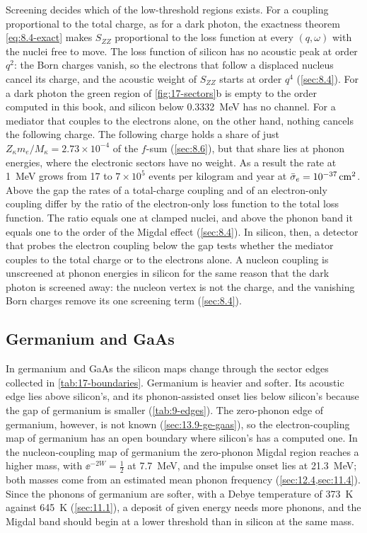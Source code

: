 Screening decides which of the low-threshold regions exists. For a coupling proportional to the total charge, as for a dark photon, the exactness theorem \cref{eq:8.4-exact} makes $S_{ZZ}$ proportional to the loss function at every $(q,\omega)$ with the nuclei free to move. The loss function of silicon has no acoustic peak at order $q^2$: the Born charges vanish, so the electrons that follow a displaced nucleus cancel its charge, and the acoustic weight of $S_{ZZ}$ starts at order $q^4$ (\cref{sec:8.4}). For a dark photon the green region of \cref{fig:17-sectors}b is empty to the order computed in this book, and silicon below \SI{0.3332}{MeV} has no channel. For a mediator that couples to the electrons alone, on the other hand, nothing cancels the following charge. The following charge holds a share of just $Z_\kappa m_e/M_\kappa = 2.73\times10^{-4}$ of the $f$-sum (\cref{sec:8.6}), but that share lies at phonon energies, where the electronic sectors have no weight. As a result the rate at \SI{1}{MeV} grows from 17 to $7\times10^5$ events per kilogram and year at $\bar{\sigma}_{e} = \SI{e-37}{cm^2}$. Above the gap the rates of a total-charge coupling and of an electron-only coupling differ by the ratio of the electron-only loss function to the total loss function. The ratio equals one at clamped nuclei, and above the phonon band it equals one to the order of the Migdal effect (\cref{sec:8.4}). In silicon, then, a detector that probes the electron coupling below the gap tests whether the mediator couples to the total charge or to the electrons alone. A nucleon coupling is unscreened at phonon energies in silicon for the same reason that the dark photon is screened away: the nucleon vertex is not the charge, and the vanishing Born charges remove its one screening term (\cref{sec:8.4}).

\subsection{Germanium and GaAs}\label{sec:17.1-ge-gaas}

In germanium and GaAs the silicon maps change through the sector edges collected in \cref{tab:17-boundaries}. Germanium is heavier and softer. Its acoustic edge lies above silicon's, and its phonon-assisted onset lies below silicon's because the gap of germanium is smaller (\cref{tab:9-edges}). The zero-phonon edge of germanium, however, is not known (\cref{sec:13.9-ge-gaas}), so the electron-coupling map of germanium has an open boundary where silicon's has a computed one. In the nucleon-coupling map of germanium the zero-phonon Migdal region reaches a higher mass, with $\ee^{-2W} = \tfrac12$ at \SI{7.7}{MeV}, and the impulse onset lies at \SI{21.3}{MeV}; both masses come from an estimated mean phonon frequency (\cref{sec:12.4,sec:11.4}). Since the phonons of germanium are softer, with a Debye temperature of \SI{373}{K} against \SI{645}{K} (\cref{sec:11.1}), a deposit of given energy needs more phonons, and the Migdal band should begin at a lower threshold than in silicon at the same mass.

